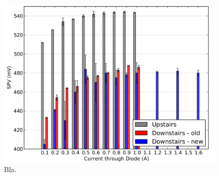 \begin{figure}
\centering
	\includegraphics[width=0.8\linewidth]{./figs/currentseries}
	\caption{Bla.}
	\label{fig:Iseries}
\end{figure}
